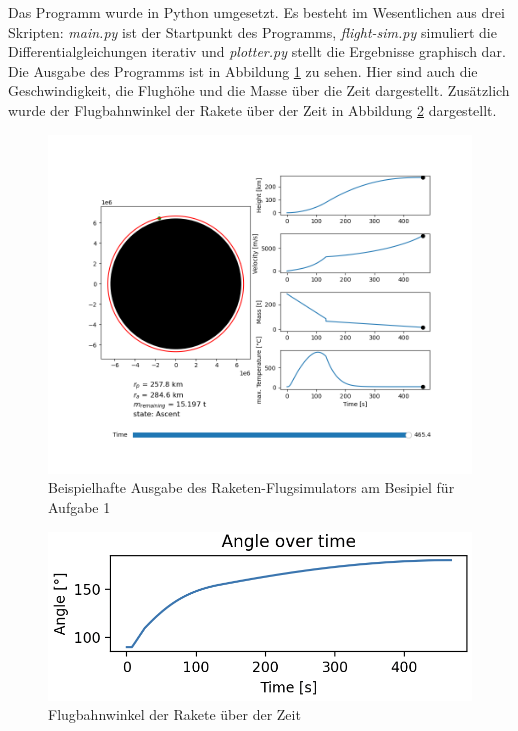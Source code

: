 \documentclass[12pt]{article}
\begin{document}
Das Programm wurde in Python umgesetzt. Es besteht im Wesentlichen aus drei Skripten: \textit{main.py} ist der Startpunkt des Programms, \textit{flight-sim.py} simuliert die Differentialgleichungen iterativ und \textit{plotter.py} stellt die Ergebnisse graphisch dar. Die Ausgabe des Programms ist in Abbildung \ref{fig:output} zu sehen. Hier sind auch die Geschwindigkeit, die Flughöhe und die Masse über die Zeit dargestellt. Zusätzlich wurde der Flugbahnwinkel der Rakete über der Zeit in Abbildung \ref{fig:angle} dargestellt. 
\begin{figure}
    \centering
    \includegraphics[width=1\textwidth]{images/output.png}
    \caption{Beispielhafte Ausgabe des Raketen-Flugsimulators am Besipiel für Aufgabe 1}
    \label{fig:output}
\end{figure}

\begin{figure}
    \centering
    \includegraphics[width=.8\textwidth]{images/angle_over_time.png}
    \caption{Flugbahnwinkel der Rakete über der Zeit}
    \label{fig:angle}
\end{figure}
\end{document}

